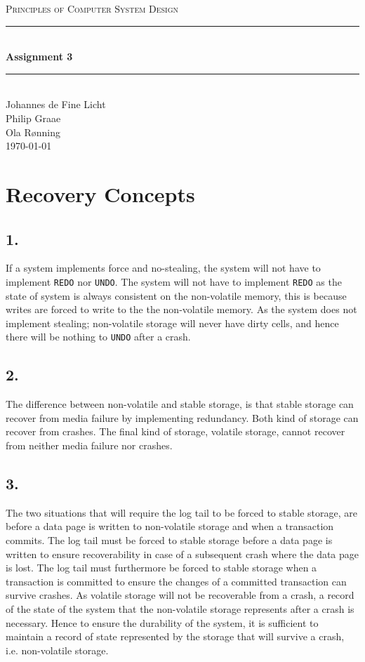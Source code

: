 \documentclass[12pt]{article}
\newcommand{\HRule}{\rule{\linewidth}{0.5mm}}
\begin{document}
\begin{center}
\textsc{\LARGE Principles of Computer System Design}\\[0.3cm] %
\HRule \\[0.4cm]
{ \huge \bfseries Assignment 3} %
\HRule \\[0.4cm]
\large
Johannes de Fine Licht %
\\Philip Graae
\\Ola Rønning
\\\today
\end{center}
\section*{Recovery Concepts}
\subsection*{1.}
If a system implements force and no-stealing, the system will not have to implement \texttt{REDO} nor \texttt{UNDO}. The system will not have to implement \texttt{REDO} as the state of system is always consistent on the non-volatile memory, this is because writes are forced to write to the the non-volatile memory. As the system does not implement stealing; non-volatile storage will never have dirty cells, and hence there will be nothing to \texttt{UNDO} after a crash.
\subsection*{2.}
The difference between non-volatile and stable storage, is that stable storage can recover from media failure by implementing redundancy. Both kind of storage can recover from crashes. The final kind of storage, volatile storage, cannot recover from neither media failure nor crashes.
\subsection*{3.}
The two situations that will require the log tail to be forced to stable storage, are before a data page is written to non-volatile storage and when a transaction commits. The log tail must be forced to stable storage before a data page is written to ensure recoverability in case of a subsequent crash where the data page is lost. The log tail must furthermore be forced to stable storage when a transaction is committed to ensure the changes of a committed transaction can survive crashes. As volatile storage will not be recoverable from a crash, a record of the state of the system that the non-volatile storage represents after a crash is necessary. Hence to ensure the durability of the system, it is sufficient to maintain a record of state represented by the storage that will survive a crash, i.e. non-volatile storage.
\end{document}
